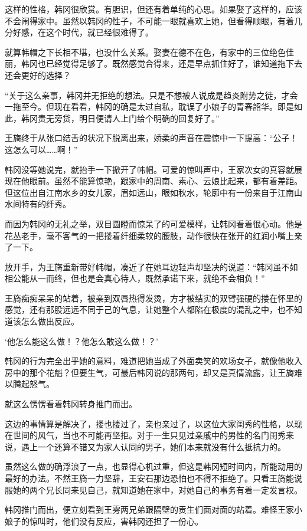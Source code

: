 这样的性格，韩冈很欣赏。有胆识，但还有着单纯的心思。如果娶了这样的，应该不会闹得家中。虽然以韩冈的性子，不可能一眼就喜欢上她，但看得顺眼，有着几分好感，在这个时代，就已经很难得了。

就算帏帽之下长相不堪，也没什么关系。娶妻在德不在色，有家中的三位绝色佳丽，韩冈也已经觉得足够了。既然感觉合得来，还是早点抓住好了，谁知道拖下去还会更好的选择？

“关于这么亲事，韩冈并无拒绝的想法。只是不想被人说成是趋炎附势之徒，才会一拖至今。但现在看看，韩冈的确是太过自私，耽误了小娘子的青春韶华。即是如此，韩冈责无旁贷，明日便请人上门给个明确的回复好了。”

王旖终于从张口结舌的状况下脱离出来，娇柔的声音在震惊中一下提高：“公子！这怎么可以……啊！”

韩冈没等她说完，就抬手一下掀开了帏帽。可爱的惊叫声中，王家次女的真容就展现在他眼前。虽然不能算惊艳，跟家中的周南、素心、云娘比起来，都有着差距。但这位出自江南水乡的女儿家，眉如远山，眼如秋水，轮廓中有一份来自于江南山水间特有的纤秀。

而因为韩冈的无礼之举，双目圆瞪而惊呆了的可爱模样，让韩冈看着很心动。他是花丛老手，毫不客气的一把搂着纤细柔软的腰肢，动作很快在张开的红润小嘴上亲了一下。

放开手，为王旖重新带好帏帽，凑近了在她耳边轻声却坚决的说道：“韩冈虽不如相公能从一而终，但也是会真心待人，既然承诺下来，就绝不会相负！”

王旖痴痴呆呆的站着，被亲到双唇热得发烫，方才被结实的双臂强硬的搂在怀里的感觉，还有那股远远不同于己的气息，让她整个人都陷在极度的混乱之中，也不知道该怎么做出反应。

‘他怎么能这么做！？他怎么敢这么做！？’

韩冈的行为完全出乎她的意料，难道把她当成了外面卖笑的欢场女子，就像他收入房中的那个花魁？但要生气，可最后韩冈说的那两句，却又是真情流露，让王旖难以腾起怒气。

就这么愣愣看着韩冈转身推门而出。

这边的事情算是解决了，搂也搂过了，亲也亲过了，以这位大家闺秀的性格，以现在世间的风气，当也不可能再坚拒。对于一生只见过亲戚中的男性的名门闺秀来说，遇上一个还算不错又为家人认同的男子，她们本来就没有什么抵抗力的。

虽然这么做的确浮浪了一点，也显得心机过重，但这是韩冈短时间内，所能动用的最好的办法。不然王旖一力坚辞，王安石那边恐怕也不得不拒绝了。只看王旖能说服她的两个兄长同来见自己，就知道她在家中，对她自己的事务有着一定发言权。

韩冈推门而出，便立刻看到王雱两兄弟跟隔壁的贡生们面对面的站着。难怪王家小娘子的惊叫时，他们没有反应，害韩冈还担了一份心。

